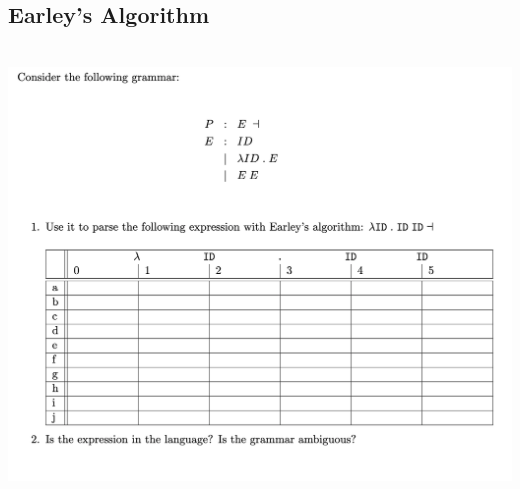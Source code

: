\documentclass[a4paper]{article}
\theoremstyle{definition}
\begin{document}
  \subsection{Earley’s Algorithm}

  \begin{center}
    \includegraphics[height=12cm]{img/Snipaste_2021-04-12_17-39-39.png}
    \end{center}
    
\end{document}
